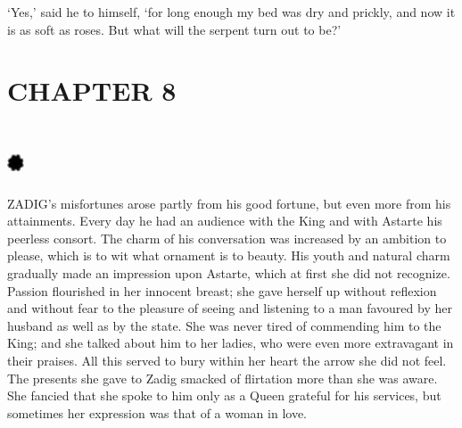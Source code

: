 \documentclass{article}
\begin{document}
\begin{center}
`Yes,' said he to himself, `for long enough my bed was dry and prickly, and now 
it is as soft as roses. But what will the serpent turn out to be?'\pagebreak{} 

\section*{\textbf{CHAPTER 8 }}

\section*{%
\includegraphics[width=14pt, height=15pt, keepaspectratio=true]{Zadig or L'Ingenu - Voltaire-fig011.jpg}
}

 

ZADIG's misfortunes arose partly from his good fortune, but even more from his 
attainments. Every day he had an audience with the King and with Astarte his peerless 
consort. The charm of his conversation was increased by an ambition to please, 
which is to wit what ornament is to beauty. His youth and natural charm gradually 
made an impression upon Astarte, which at first she did not recognize. Passion 
flourished in her innocent breast; she gave herself up without reflexion and without 
fear to the pleasure of seeing and listening to a man favoured by her husband as 
well as by the state. She was never tired of commending him to the King; and she 
talked about him to her ladies, who were even more extravagant in their praises. 
All this served to bury within her heart the arrow she did not feel. The presents 
she gave to Zadig smacked of flirtation more than she was aware. She fancied that 
she spoke to him only as a Queen grateful for his services, but sometimes her expression 
was that of a woman in love. 


\end{center}
\end{document}
